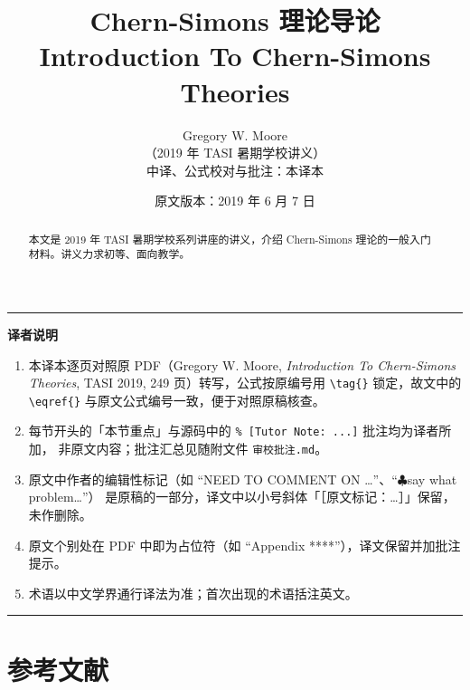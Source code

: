\documentclass[11pt,a4paper]{article}
\title{\bfseries Chern-Simons 理论导论\\[6pt]
  \large Introduction To Chern-Simons Theories}
\author{Gregory W. Moore\\[2pt]
  \normalsize（2019 年 TASI 暑期学校讲义）\\[10pt]
  \normalsize 中译、公式校对与批注：本译本}
\date{原文版本：2019 年 6 月 7 日}
\theoremstyle{plain}
\theoremstyle{definition}
\theoremstyle{remark}
\begin{document}
\maketitle

\begin{abstract}
\noindent
本文是 2019 年 TASI 暑期学校系列讲座的讲义，介绍 Chern-Simons 理论的一般入门材料。讲义力求初等、面向教学。
\end{abstract}

\vspace{1em}
\noindent\rule{\linewidth}{0.4pt}
\noindent\textbf{译者说明}

\begin{enumerate}[leftmargin=2em,itemsep=2pt]
  \item 本译本逐页对照原 PDF（Gregory W. Moore, \emph{Introduction To Chern-Simons Theories},
        TASI 2019, 249 页）转写，公式按原编号用 \verb|\tag{}| 锁定，故文中的 \verb|\eqref{}|
        与原文公式编号一致，便于对照原稿核查。
  \item 每节开头的「本节重点」与源码中的 \verb|% [Tutor Note: ...]| 批注均为译者所加，
        非原文内容；批注汇总见随附文件 \texttt{审校批注.md}。
  \item 原文中作者的编辑性标记（如 ``NEED TO COMMENT ON \ldots''、``$\clubsuit$say what problem\ldots''）
        是原稿的一部分，译文中以小号斜体「［原文标记：\ldots］」保留，未作删除。
  \item 原文个别处在 PDF 中即为占位符（如 ``Appendix ****''），译文保留并加批注提示。
  \item 术语以中文学界通行译法为准；首次出现的术语括注英文。
\end{enumerate}
\noindent\rule{\linewidth}{0.4pt}

\clearpage
\tableofcontents
\clearpage






















\appendix










\clearpage
\section*{参考文献}

\end{document}
